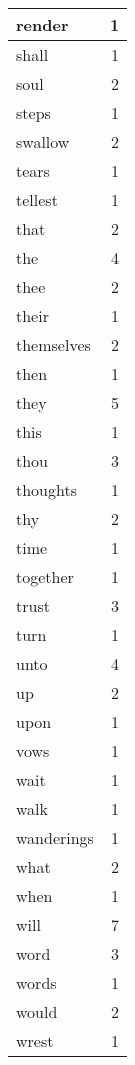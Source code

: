 \begin{center}
\begin{longtable}{l|r}
render & 1 \\ \hline
shall & 1 \\ \hline
soul & 2 \\ \hline
steps & 1 \\ \hline
swallow & 2 \\ \hline
tears & 1 \\ \hline
tellest & 1 \\ \hline
that & 2 \\ \hline
the & 4 \\ \hline
thee & 2 \\ \hline
their & 1 \\ \hline
themselves & 2 \\ \hline
then & 1 \\ \hline
they & 5 \\ \hline
this & 1 \\ \hline
thou & 3 \\ \hline
thoughts & 1 \\ \hline
thy & 2 \\ \hline
time & 1 \\ \hline
together & 1 \\ \hline
trust & 3 \\ \hline
turn & 1 \\ \hline
unto & 4 \\ \hline
up & 2 \\ \hline
upon & 1 \\ \hline
vows & 1 \\ \hline
wait & 1 \\ \hline
walk & 1 \\ \hline
wanderings & 1 \\ \hline
what & 2 \\ \hline
when & 1 \\ \hline
will & 7 \\ \hline
word & 3 \\ \hline
words & 1 \\ \hline
would & 2 \\ \hline
wrest & 1 \\ \hline
\end{longtable}
\end{center}



\normalsize



